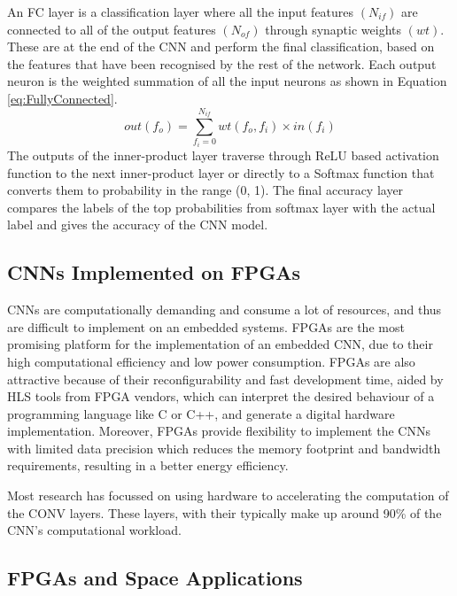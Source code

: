 \documentclass[12pt]{article}
\begin{document}
An FC layer is a classification layer where all the input features $(N_{if})$ are connected to all of the output features $(N_{of})$ through synaptic weights $(wt)$. These are at the end of the CNN and perform the final classification, based on the features that have been recognised by the rest of the network. Each output neuron is the weighted summation of all the input neurons as shown in Equation \ref{eq:FullyConnected}\cite{fpgaCnnAccelerator}.
\begin{equation}
out(f_o)=\sum^{N_{if}}_{f_i=0}wt(f_o,f_i)\times in(f_i)
\label{eq:FullyConnected}
\end{equation}
The outputs of the inner-product layer traverse through ReLU based activation function to the next inner-product layer or directly to a Softmax function that converts them to probability in the range (0, 1). The final accuracy layer compares the labels of the top probabilities from softmax layer with the actual label and gives the accuracy of the CNN model\cite{fpgaCnnAccelerator}.

\subsection{CNNs Implemented on FPGAs}
\label{sec:Background-CNNsImplementedOnFPGAs}

CNNs are computationally demanding and consume a lot of resources, and thus are difficult to implement on an embedded systems. FPGAs are the most promising platform for the implementation of an embedded CNN, due to their high computational efficiency and low power consumption. FPGAs are also attractive because of their reconfigurability and fast development time, aided by HLS tools from FPGA vendors, which can interpret the desired behaviour of a programming language like C or C++, and generate a digital hardware implementation. Moreover, FPGAs provide flexibility to implement the CNNs with limited data precision which reduces the memory footprint and bandwidth requirements, resulting in a better energy efficiency\cite{fpgaCnnAccelerator}.

Most research has focussed on using hardware to accelerating the computation of the CONV layers. These layers, with their  typically make up around 90\% of the CNN's computational workload.

\subsection{FPGAs and Space Applications}
\label{sec:Background-FPGAsAndSpaceApplications}
\end{document}
